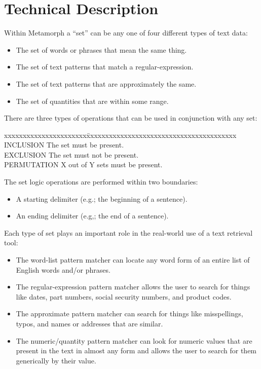 \section{Technical Description}

Within Metamorph a ``set'' can be any one of four different types of
text data:

\begin{itemize}
\item
The set of words or phrases that mean the same thing.
\item
The set of text patterns that match a regular-expression.
\item
The set of text patterns that are approximately the same.
\item
The set of quantities that are within some range.
\end{itemize}

There are three types of operations that can be used in
conjunction with any set:

\begin{tabbing}
xxxxxxxxxxxxxxxxxxxxxx\= xxxxxxxxxxxxxxxxxxxxxxxxxxxxxxxxxxxxxxxx \kill
INCLUSION             \> The set must be present.                 \\
EXCLUSION             \> The set must not be present.             \\
PERMUTATION           \> X out of Y sets must be present.         \\
\end{tabbing}

The set logic operations are performed within two boundaries:

\begin{itemize}
\item
A starting delimiter (e.g.; the beginning of a sentence).
\item
An ending  delimiter (e.g,; the end of a sentence).
\end{itemize}

Each type of set plays an important role in the real-world use of
a text retrieval tool:
\begin{itemize}
\item
The word-list pattern matcher can locate any word
form of an entire list of English words and/or
phrases.
\item
The regular-expression pattern matcher allows the
user to search for things like dates, part numbers,
social security numbers, and product codes.
\item
The approximate pattern matcher can search for
things like misspellings, typos, and names or
addresses that are similar.
\item
The numeric/quantity pattern matcher can look for
numeric values that are present in the text in
almost any form and allows the user to search for
them generically by their value.
\end{itemize}

